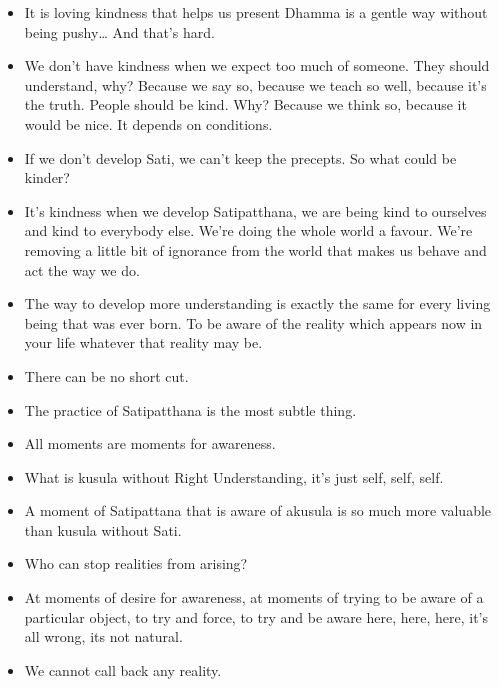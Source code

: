 \documentclass{article}
\begin{document}
\begin{itemize}
\item 
  It is loving kindness that helps us present Dhamma is a gentle way
  without being pushy\ldots{} And that's hard.

\item 
  We don't have kindness when we expect too much of someone. They
  should understand, why? Because we say so, because we teach so
  well, because it's the truth. People should be kind. Why? Because
  we think so, because it would be nice. It depends on conditions.

\item 
  If we don't develop Sati, we can't keep the precepts. So what could
  be kinder?

\item 
  It's kindness when we develop Satipatthana, we are being kind to
  ourselves and kind to everybody else. We're doing the whole world a
  favour. We're removing a little bit of ignorance from the world
  that makes us behave and act the way we do.

\item 
  The way to develop more understanding is exactly the same for every
  living being that was ever born. To be aware of the reality which
  appears now in your life whatever that reality may be.

\item 
  There can be no short cut.

\item 
  The practice of Satipatthana is the most subtle thing.

\item 
  All moments are moments for awareness.

\item 
  What is kusula without Right Understanding, it's just self, self,
  self.

\item 
  A moment of Satipattana that is aware of akusula is so much more
  valuable than kusula without Sati.

\item 
  Who can stop realities from arising?

\item 
  At moments of desire for awareness, at moments of trying to be
  aware of a particular object, to try and force, to try and be aware
  here, here, here, it's all wrong, its not natural.

\item 
  We cannot call back any reality.


\end{itemize}
\end{document}
